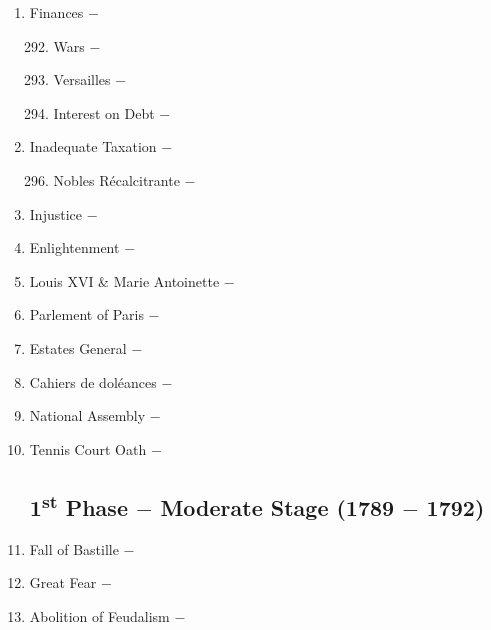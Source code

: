 \documentclass[12pt]{article}
\begin{document}
\begin{enumerate}
\item Finances $-$

\begin{enumerate}[label=\arabic{*}.]
\setcounter{enumii}{291}

\item Wars $-$

\item Versailles $-$

\item Interest on Debt $-$ 

\end{enumerate}
\setcounter{enumi}{294}

\item Inadequate Taxation $-$ 

\begin{enumerate}[label=\arabic{*}.]
\setcounter{enumii}{295}

\item Nobles R\'ecalcitrante $-$

\end{enumerate}
\setcounter{enumi}{296}

\item Injustice $-$

\item Enlightenment $-$ 

\item Louis XVI \& Marie Antoinette $-$

\item Parlement of Paris $-$ 

\item Estates General $-$ 

\item Cahiers de dol\'eances $-$

\item National Assembly $-$

\item Tennis Court Oath $-$ 

\subsection{1\textsuperscript{st} Phase $-$ Moderate Stage (1789 $-$ 1792)}

\item Fall of Bastille $-$ 

\item Great Fear $-$ 

\item Abolition of Feudalism $-$ 


\end{enumerate}
\end{document}
